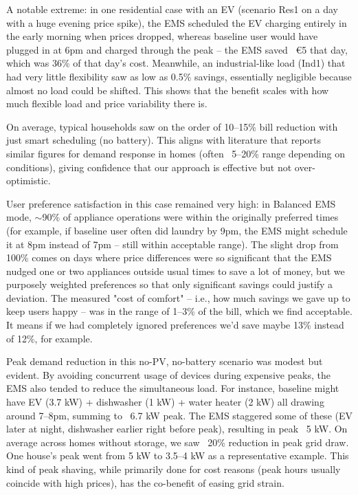 \documentclass[12pt,a4paper]{article}
\begin{document}
A notable extreme: in one residential case with an EV (scenario Res1 on a day with a huge evening price spike), the EMS scheduled the EV charging entirely in the early morning when prices dropped, whereas baseline user would have plugged in at 6pm and charged through the peak – the EMS saved ~€5 that day, which was 36\% of that day’s cost. Meanwhile, an industrial-like load (Ind1) that had very little flexibility saw as low as 0.5\% savings, essentially negligible because almost no load could be shifted. This shows that the benefit scales with how much flexible load and price variability there is.

On average, typical households saw on the order of 10–15\% bill reduction with just smart scheduling (no battery). This aligns with literature that reports similar figures for demand response in homes (often ~5–20\% range depending on conditions), giving confidence that our approach is effective but not over-optimistic.

User preference satisfaction in this case remained very high: in Balanced EMS mode, $\sim$90\% of appliance operations were within the originally preferred times (for example, if baseline user often did laundry by 9pm, the EMS might schedule it at 8pm instead of 7pm – still within acceptable range). The slight drop from 100\% comes on days where price differences were so significant that the EMS nudged one or two appliances outside usual times to save a lot of money, but we purposely weighted preferences so that only significant savings could justify a deviation. The measured "cost of comfort" – i.e., how much savings we gave up to keep users happy – was in the range of 1–3\% of the bill, which we find acceptable. It means if we had completely ignored preferences we'd save maybe 13\% instead of 12\%, for example.

Peak demand reduction in this no-PV, no-battery scenario was modest but evident. By avoiding concurrent usage of devices during expensive peaks, the EMS also tended to reduce the simultaneous load. For instance, baseline might have EV (3.7 kW) + dishwasher (1 kW) + water heater (2 kW) all drawing around 7–8pm, summing to ~6.7 kW peak. The EMS staggered some of these (EV later at night, dishwasher earlier right before peak), resulting in peak ~5 kW. On average across homes without storage, we saw ~20\% reduction in peak grid draw. One house's peak went from 5 kW to 3.5–4 kW as a representative example. This kind of peak shaving, while primarily done for cost reasons (peak hours usually coincide with high prices), has the co-benefit of easing grid strain.
\end{document}
